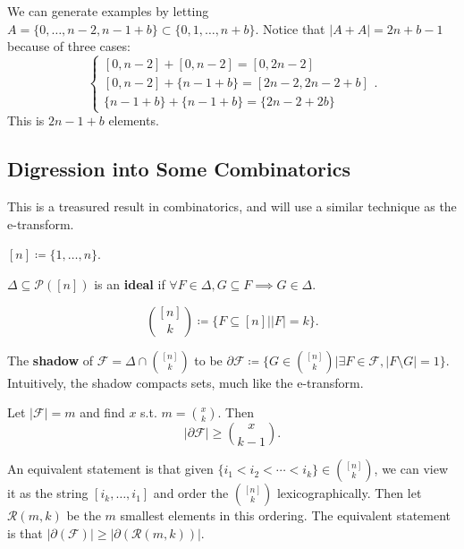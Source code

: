 \documentclass[a4paper]{article}
\begin{document}
\begin{example}
	We can generate examples by letting $A = \{0,\ldots ,n-2, n-1+b\} \subset \{0,1,\ldots ,n+b\}    $.
	Notice that $|A+A| = 2n+b-1 $ because of three cases:
	\[
		\begin{cases}
			[0,n-2] + [0,n-2] = [0,2n-2]\\
			[0,n-2] + \{n-1+b\}  = [2n-2,2n-2+b]\\
			\{n-1+b\} + \{n-1+b\}  = \{2n-2+2b\}
		\end{cases}
	.\]
	This is $2n-1+b $ elements.
\end{example}

\subsection{Digression into Some Combinatorics}

This is a treasured result in combinatorics, and will use a similar technique as the e-transform.

\begin{definition}
	$[n] \coloneqq \{1,\ldots,n\}   $.
\end{definition}

\begin{definition}
	$\Delta\subseteq \mathcal{P}([n]) $ is an \textbf{ideal} if $\forall F\in \Delta , G\subseteq F \implies G \in \Delta$.
\end{definition}

\begin{definition}
	\[
		\binom{[n]}{k} \coloneqq  \{F\subseteq [n] \vert |F| = k\}
	.\]
\end{definition}

\begin{definition}
	The \textbf{shadow} of $\mathcal{F} = \Delta \cap \binom{[n]}{k}$ to be $\partial \mathcal{F} \coloneqq \{G \in \binom{[n]}{k} | \exists F \in \mathcal{F}, |F \setminus G| = 1\}   $.
	Intuitively, the shadow compacts sets, much like the e-transform.
\end{definition}

\begin{thm}
	Let $|\mathcal{F}| = m $ and find $x $ s.t. $m = \binom{x}{k} $.
	Then
	\[
		|\partial \mathcal{F}| \ge \binom{x}{k-1}
	.\]
\end{thm}

An equivalent statement is that given $\{i_{1} < i_{2} < \cdots < i_k \} \in \binom{[n]}{k}  $, we can view it as the string $[i_k,\ldots,i_{1}] $ and order the $\binom{[n]}{k} $ lexicographically.
Then let $\mathcal{R}(m,k) $ be the $m $ smallest elements in this ordering.
The equivalent statement is that $|\partial(\mathcal{F})| \ge |\partial(\mathcal{R}(m,k))| $.
\end{document}
